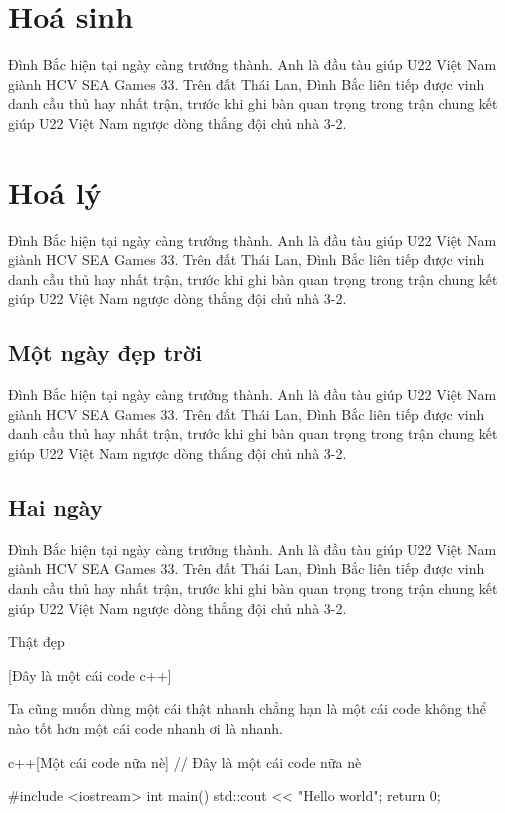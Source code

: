 \section{Hoá sinh} 

Đình Bắc hiện tại ngày càng trưởng thành. Anh là đầu tàu giúp U22 Việt Nam giành HCV SEA Games 33. Trên đất Thái Lan, Đình Bắc liên tiếp được vinh danh cầu thủ hay nhất trận, trước khi ghi bàn quan trọng trong trận chung kết giúp U22 Việt Nam ngược dòng thắng đội chủ nhà 3-2.

\section{Hoá lý}

Đình Bắc hiện tại ngày càng trưởng thành. Anh là đầu tàu giúp U22 Việt Nam giành HCV SEA Games 33. Trên đất Thái Lan, Đình Bắc liên tiếp được vinh danh cầu thủ hay nhất trận, trước khi ghi bàn quan trọng trong trận chung kết giúp U22 Việt Nam ngược dòng thắng đội chủ nhà 3-2.

\subsection{Một ngày đẹp trời}
Đình Bắc hiện tại ngày càng trưởng thành. Anh là đầu tàu giúp U22 Việt Nam giành HCV SEA Games 33. Trên đất Thái Lan, Đình Bắc liên tiếp được vinh danh cầu thủ hay nhất trận, trước khi ghi bàn quan trọng trong trận chung kết giúp U22 Việt Nam ngược dòng thắng đội chủ nhà 3-2.

\subsection{Hai ngày}
Đình Bắc hiện tại ngày càng trưởng thành. Anh là đầu tàu giúp U22 Việt Nam giành HCV SEA Games 33. Trên đất Thái Lan, Đình Bắc liên tiếp được vinh danh cầu thủ hay nhất trận, trước khi ghi bàn quan trọng trong trận chung kết giúp U22 Việt Nam ngược dòng thắng đội chủ nhà 3-2.

Thật đẹp 



[Đây là một cái code c++]

Ta cũng muốn dùng  một cái thật nhanh chẳng hạn là một cái code không thể nào tốt hơn một cái code nhanh ơi là nhanh.

\begin{xcode}{c++}[Một cái code nữa nè]
// Đây là một cái code nữa nè 

#include <iostream>
int main() {
    std::cout << "Hello world";
    return 0; 
}
\end{xcode}     

